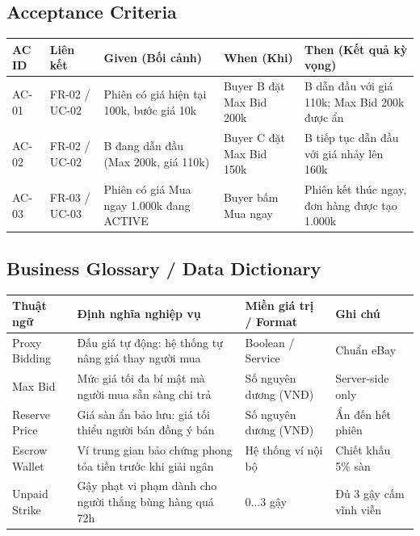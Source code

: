 \documentclass[11pt,a4paper]{article}
\begin{document}
\subsection{Acceptance Criteria}
\begin{table}[H]
    \centering
    \small
    \begin{tabularx}{\textwidth}{|l|l|X|X|X|}
        \hline
        \textbf{AC ID} & \textbf{Liên kết} & \textbf{Given (Bối cảnh)} & \textbf{When (Khi)} & \textbf{Then (Kết quả kỳ vọng)} \\ \hline
        AC-01 & FR-02 / UC-02 & Phiên có giá hiện tại 100k, bước giá 10k & Buyer B đặt Max Bid 200k & B dẫn đầu với giá 110k; Max Bid 200k được ẩn \\ \hline
        AC-02 & FR-02 / UC-02 & B đang dẫn đầu (Max 200k, giá 110k) & Buyer C đặt Max Bid 150k & B tiếp tục dẫn đầu với giá nhảy lên 160k \\ \hline
        AC-03 & FR-03 / UC-03 & Phiên có giá Mua ngay 1.000k đang ACTIVE & Buyer bấm Mua ngay & Phiên kết thúc ngay, đơn hàng được tạo 1.000k \\ \hline
    \end{tabularx}
\end{table}

\subsection{Business Glossary / Data Dictionary}
\begin{table}[H]
    \centering
    \small
    \begin{tabularx}{\textwidth}{|l|X|l|l|}
        \hline
        \textbf{Thuật ngữ} & \textbf{Định nghĩa nghiệp vụ} & \textbf{Miền giá trị / Format} & \textbf{Ghi chú} \\ \hline
        Proxy Bidding & Đấu giá tự động: hệ thống tự nâng giá thay người mua & Boolean / Service & Chuẩn eBay \\ \hline
        Max Bid & Mức giá tối đa bí mật mà người mua sẵn sàng chi trả & Số nguyên dương (VNĐ) & Server-side only \\ \hline
        Reserve Price & Giá sàn ẩn bảo lưu: giá tối thiểu người bán đồng ý bán & Số nguyên dương (VNĐ) & Ẩn đến hết phiên \\ \hline
        Escrow Wallet & Ví trung gian bảo chứng phong tỏa tiền trước khi giải ngân & Hệ thống ví nội bộ & Chiết khấu 5\% sàn \\ \hline
        Unpaid Strike & Gậy phạt vi phạm dành cho người thắng bùng hàng quá 72h & $0 \dots 3$ gậy & Đủ 3 gậy cấm vĩnh viễn \\ \hline
    \end{tabularx}
\end{table}
\end{document}

